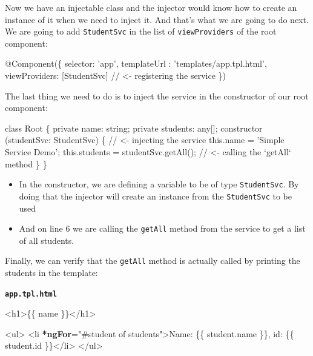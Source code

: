 \documentclass[12pt,]{article}
\newenvironment{Shaded}{}{}
\newcommand{\KeywordTok}[1]{\textcolor[rgb]{0.00,0.00,1.00}{{#1}}}
\newcommand{\StringTok}[1]{\textcolor[rgb]{0.00,0.50,0.50}{{#1}}}
\newcommand{\CommentTok}[1]{\textcolor[rgb]{0.00,0.50,0.00}{{#1}}}
\newcommand{\OtherTok}[1]{\textcolor[rgb]{1.00,0.25,0.00}{{#1}}}
\newcommand{\FunctionTok}[1]{{#1}}
\newcommand{\ErrorTok}[1]{\textcolor[rgb]{1.00,0.00,0.00}{\textbf{{#1}}}}
\newcommand{\NormalTok}[1]{{#1}}
\begin{document}
Now we have an injectable class and the injector would know how to
create an instance of it when we need to inject it. And that's what we
are going to do next. We are going to add \texttt{StudentSvc} in the
list of \texttt{viewProviders} of the root component:

\begin{Shaded}
\begin{Highlighting}[numbers=left,,]
\FunctionTok{@Component}\NormalTok{(\{}
  \NormalTok{selector: 'app',}
  \NormalTok{templateUrl : 'templates/app.}\FunctionTok{tpl}\NormalTok{.}\FunctionTok{html}\NormalTok{',}
  \NormalTok{viewProviders: [StudentSvc] }\CommentTok{// <- registering the service}
\NormalTok{\})}
\end{Highlighting}
\end{Shaded}

The last thing we need to do is to inject the service in the constructor
of our root component:

\begin{Shaded}
\begin{Highlighting}[numbers=left,,]
\KeywordTok{class} \NormalTok{Root  \{}
  \KeywordTok{private} \NormalTok{name: string;}
  \KeywordTok{private} \NormalTok{students: any[];}
  \FunctionTok{constructor} \NormalTok{(studentSvc: StudentSvc) \{ }\CommentTok{// <- injecting the service}
    \KeywordTok{this}\NormalTok{.}\FunctionTok{name} \NormalTok{= 'Simple Service Demo';}
    \KeywordTok{this}\NormalTok{.}\FunctionTok{students} \NormalTok{= studentSvc.}\FunctionTok{getAll}\NormalTok{(); }\CommentTok{// <- calling the `getAll` method}
  \NormalTok{\}}
\NormalTok{\}}
\end{Highlighting}
\end{Shaded}

\begin{itemize}
\item
  In the constructor, we are defining a variable to be of type
  \texttt{StudentSvc}. By doing that the injector will create an
  instance from the \texttt{StudentSvc} to be used
\item
  And on line 6 we are calling the \texttt{getAll} method from the
  service to get a list of all students.
\end{itemize}

Finally, we can verify that the \texttt{getAll} method is actually
called by printing the students in the template:

\textbf{\texttt{app.tpl.html}}

\begin{Shaded}
\begin{Highlighting}[numbers=left,,]
\KeywordTok{<h1>}\NormalTok{\{\{ name \}\}}\KeywordTok{</h1>}

\KeywordTok{<ul>}
  \KeywordTok{<li} \ErrorTok{*ngFor}\OtherTok{=}\StringTok{"#student of students"}\KeywordTok{>}\NormalTok{Name: \{\{ student.name \}\}, id: \{\{ student.id \}\}}\KeywordTok{</li>}
\KeywordTok{</ul>}
\end{Highlighting}
\end{Shaded}
\end{document}
